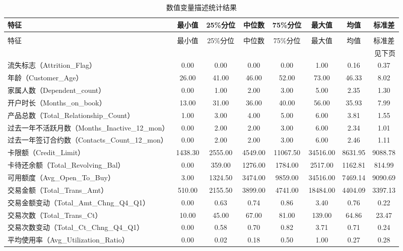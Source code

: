   \footnotesize{\small}
  \begin{longtable}{lccccccc}
  \caption{数值变量描述统计结果} \label{num_var_desc} \\
  \toprule
  特征 & 最小值 & 25\%分位 & 中位数 & 75\%分位 & 最大值 & 均值 & 标准差 \\
  \midrule
  \endfirsthead
  \caption[]{数值变量描述统计结果} \\
  \toprule
  特征& 最小值 & 25\%分位 & 中位数 & 75\%分位 & 最大值 & 均值 & 标准差 \\
  \midrule
  \endhead
  \midrule
  \multicolumn{8}{r}{见下页} \\
  \midrule
  \endfoot
  \bottomrule
  \endlastfoot
  流失标志（Attrition\_Flag） & 0.00 & 0.00 & 0.00 & 0.00 & 1.00 & 0.16 & 0.37 \\
  年龄（Customer\_Age） & 26.00 & 41.00 & 46.00 & 52.00 & 73.00 & 46.33 & 8.02 \\
  家属人数（Dependent\_count） & 0.00 & 1.00 & 2.00 & 3.00 & 5.00 & 2.35 & 1.30 \\
  开户时长（Months\_on\_book） & 13.00 & 31.00 & 36.00 & 40.00 & 56.00 & 35.93 & 7.99 \\
  产品总数（Total\_Relationship\_Count） & 1.00 & 3.00 & 4.00 & 5.00 & 6.00 & 3.81 & 1.55 \\
  {过去一年不活跃月数（Months\_Inactive\_12\_mon）} & 0.00 & 2.00 & 2.00 & 3.00 & 6.00 & 2.34 & 1.01 \\
  {过去一年签订合约数（Contacts\_Count\_12\_mon）} & 0.00 & 2.00 & 2.00 & 3.00 & 6.00 & 2.46 & 1.11 \\
  卡限额（Credit\_Limit） & 1438.30 & 2555.00 & 4549.00 & 11067.50 & 34516.00 & 8631.95 & 9088.78 \\
  卡待还余额（Total\_Revolving\_Bal） & 0.00 & 359.00 & 1276.00 & 1784.00 & 2517.00 & 1162.81 & 814.99 \\
  可用额度（Avg\_Open\_To\_Buy） & 3.00 & 1324.50 & 3474.00 & 9859.00 & 34516.00 & 7469.14 & 9090.69 \\
  交易金额（Total\_Trans\_Amt） & 510.00 & 2155.50 & 3899.00 & 4741.00 & 18484.00 & 4404.09 & 3397.13 \\
  交易金额变动（Total\_Amt\_Chng\_Q4\_Q1） & 0.00 & 0.63 & 0.74 & 0.86 & 3.40 & 0.76 & 0.22 \\
  交易次数（Total\_Trans\_Ct） & 10.00 & 45.00 & 67.00 & 81.00 & 139.00 & 64.86 & 23.47 \\
  交易次数变动（Total\_Ct\_Chng\_Q4\_Q1） & 0.00 & 0.58 & 0.70 & 0.82 & 3.71 & 0.71 & 0.24 \\
  平均使用率（Avg\_Utilization\_Ratio） & 0.00 & 0.02 & 0.18 & 0.50 & 1.00 & 0.27 & 0.28 \\
  \end{longtable}


